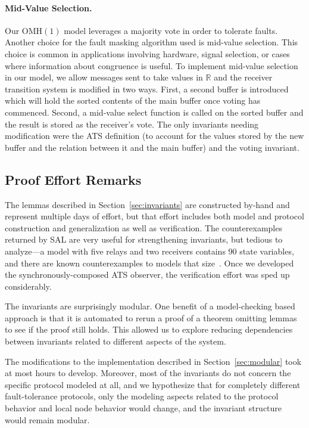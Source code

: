 \documentclass{llncs/llncs}
\newcommand{\OMH}{\ensuremath{\mathrm{OMH}}\xspace}
\begin{document}
{\paragraph{Mid-Value Selection.}
Our $\OMH(1)$ model leverages a majority vote in order to tolerate faults. Another choice for the fault masking algorithm used is mid-value selection. This choice is common in applications involving hardware, signal selection, or cases where information about congruence is useful. To implement mid-value selection in our model, we allow messages sent to take values in $\mathbb{R}$ and the receiver transition system is modified in two ways. First, a second buffer is introduced which will hold the sorted contents of the main buffer once voting has commenced. Second, a mid-value select function is called on the sorted buffer and the result is stored as the receiver's vote. The only invariants needing modification were the ATS definition (to account for the values stored by the new buffer and the relation between it and the main buffer) and the voting invariant.


\subsection{Proof Effort Remarks}

The lemmas described in Section~\ref{sec:invariants} are constructed by-hand and represent multiple days of effort, but that effort includes both model and protocol construction and generalization as well as verification. The counterexamples returned by SAL are very useful for strengthening invariants, but tedious to analyze---a model with five relays and two receivers contains 90 state variables, and there are known counterexamples to models that size~\cite{Lincoln-Rushby}. Once we developed the synchronously-composed ATS observer, the verification effort was sped up considerably.

The invariants are surprisingly modular. One benefit of a model-checking based approach is that it is automated to rerun a proof of a theorem omitting lemmas to see if the proof still holds. This allowed us to explore reducing dependencies between invariants related to different aspects of the system.

The modifications to the implementation described in Section~\ref{sec:modular} took at most hours to develop. Moreover, most of the invariants do not concern the specific protocol modeled at all, and we hypothesize that for completely different fault-tolerance protocols, only the modeling aspects related to the protocol behavior and local node behavior would change, and the invariant structure would remain modular.

}
\end{document}
